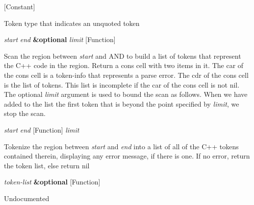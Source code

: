 \vspace{1em}
\noindent
{}
\usebox{\funcname}
 \hfill [Constant]

\begin{doc-string}
Token type that indicates an unquoted token
\end{doc-string}

\vspace{1em}
\noindent
{}
\usebox{\funcname}\emph{start} \emph{end} \textbf{\&optional} \emph{limit}
 \hfill [Function]

\begin{doc-string}
Scan the region between \emph{start} and AND to build a list of tokens that represent the C++
code in the region.  Return a cons cell with two items in it.  The car of the cons cell
is a token-info that represents a parse error.  The cdr of the cons cell is the list of
tokens.  This list is incomplete if the car of the cons cell is not nil.  The optional
\emph{limit} argument is used to bound the scan as follows.  When we have added to the list the
first token that is beyond the point specified by \emph{limit}, we stop the scan.
\end{doc-string}

\vspace{1em}
\noindent
{}
\usebox{\funcname}\emph{start} \emph{end}
 \hfill [Function]
\hspace*{\wd\funcname}\emph{limit}

\begin{doc-string}
Tokenize the region between \emph{start} and \emph{end} into a list of all of the C++
tokens contained therein, displaying any error message, if there is one.  If no
error, return the token list, else return nil
\end{doc-string}

\vspace{1em}
\noindent
{}
\usebox{\funcname}\emph{token-list} \textbf{\&optional}
 \hfill [Function]
\hspace*{\wd\funcname}

\begin{doc-string}
Undocumented
\end{doc-string}

